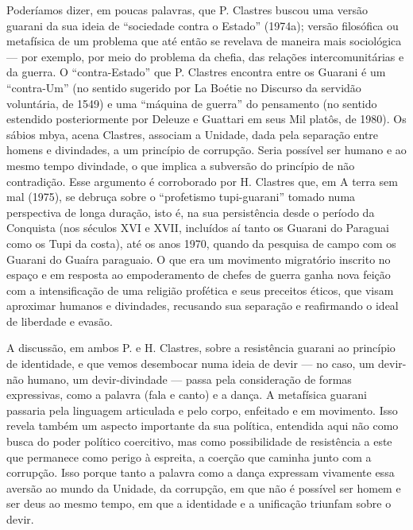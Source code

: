 Poderíamos dizer, em poucas palavras, que P. Clastres buscou uma versão
guarani da sua ideia de ``sociedade contra o Estado'' (1974a); versão
filosófica ou metafísica de um problema que até então se revelava de
maneira mais sociológica — por exemplo, por meio do problema da chefia,
das relações intercomunitárias e da guerra. O ``contra-Estado'' que P.
Clastres encontra entre os Guarani é um ``contra-Um'' (no sentido
sugerido por La Boétie no Discurso da servidão voluntária, de 1549) e
uma ``máquina de guerra'' do pensamento (no sentido estendido
posteriormente por Deleuze e Guattari em seus Mil platôs, de 1980). Os
sábios mbya, acena Clastres, associam a Unidade, dada pela separação
entre homens e divindades, a um princípio de corrupção. Seria possível
ser humano e ao mesmo tempo divindade, o que implica a subversão do
princípio de não contradição. Esse argumento é corroborado por H.
Clastres que, em A terra sem mal (1975), se debruça sobre o ``profetismo
tupi-guarani'' tomado numa perspectiva de longa duração, isto é, na sua
persistência desde o período da Conquista (nos séculos XVI e XVII,
incluídos aí tanto os Guarani do Paraguai como os Tupi da costa), até
os anos 1970, quando da pesquisa de campo com os Guarani do Guaíra
paraguaio. O que era um movimento migratório inscrito no espaço e em
resposta ao empoderamento de chefes de guerra ganha nova feição com a
intensificação de uma religião profética e seus preceitos éticos, que
visam aproximar humanos e divindades, recusando sua separação e
reafirmando o ideal de liberdade e evasão.

A discussão, em ambos P. e H. Clastres, sobre a resistência guarani ao
princípio de identidade, e que vemos desembocar numa ideia de devir —
no caso, um devir-não humano, um devir-divindade — passa pela
consideração de formas expressivas, como a palavra (fala e canto) e a
dança. A metafísica guarani passaria pela linguagem articulada e pelo
corpo, enfeitado e em movimento. Isso revela também um aspecto
importante da sua política, entendida aqui não como busca do poder
político coercitivo, mas como possibilidade de resistência a este que
permanece como perigo à espreita, a coerção que caminha junto com a
corrupção. Isso porque tanto a palavra como a dança expressam vivamente
essa aversão ao mundo da Unidade, da corrupção, em que não é possível
ser homem e ser deus ao mesmo tempo, em que a identidade e a unificação
triunfam sobre o devir. 

